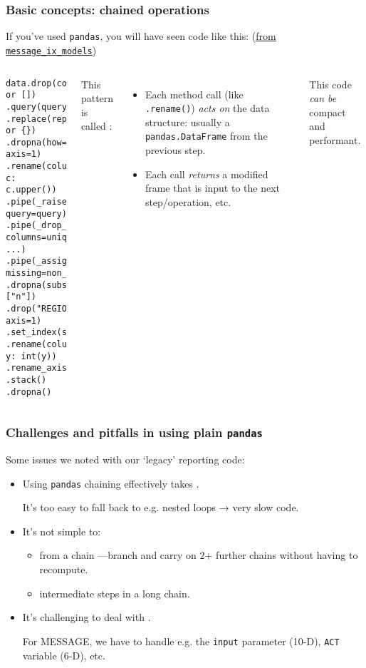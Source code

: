 \documentclass[12pt,aspectratio=169]{beamer}
\renewcommand{\mod}[1]{\texttt{#1}}
\newcommand{\py}[1]{\texttt{#1}}
\begin{document}
\begin{frame}[fragile]
\frametitle{Basic concepts: chained operations}
If you've used \mod{pandas},
you will have seen code like this:
(\href{https://github.com/iiasa/message-ix-models/blob/7a999bc0c636f0afea73f89f12e5cfe593d6d23c/message_ix_models/tools/iamc.py#L240-L254}
{from \mod{message_ix_models}})

\begin{columns}
\column{0.45\paperwidth}
\begin{verbatim}
data.drop(columns=drop or [])
.query(query)
.replace(replace or {})
.dropna(how="all", axis=1)
.rename(columns=lambda c: c.upper())
.pipe(_raise_empty, query=query)
.pipe(_drop_unique, columns=unique, ...)
.pipe(_assign_n, missing=non_iso_3166)
.dropna(subset=["n"])
.drop("REGION", axis=1)
.set_index(set_index)
.rename(columns=lambda y: int(y))
.rename_axis(columns="y")
.stack()
.dropna()
\end{verbatim}

\column{0.45\paperwidth}
\pause
This pattern is called :
\begin{itemize}
  \item Each method call (like \py{.rename()}) \emph{acts on}
    the data structure: usually a \py{pandas.DataFrame} from the previous step.
  \item Each call \emph{returns} a modified frame that is input to the next step/operation, etc.
\end{itemize}

This code \emph{can be} compact and performant.
\end{columns}
\end{frame}

\begin{frame}
\frametitle{Challenges and pitfalls in using plain \texttt{pandas}}

Some issues we noted with our ‘legacy' reporting code:

\bigskip
\begin{itemize}
  \item Using \mod{pandas} chaining effectively takes .

    It's too easy to fall back to e.g. nested loops → very slow code.
  \item It's not simple to:
    \begin{itemize}
      \item {} from a chain%
        —branch and carry on 2+ further chains without having to recompute.
      \item {} intermediate steps in a long chain.
    \end{itemize}
  \item It's challenging to deal with .

    For MESSAGE, we have to handle e.g. the
    \texttt{input} parameter (10-D),
    \texttt{ACT} variable (6-D), etc.
\end{itemize}
\end{frame}
\end{document}
